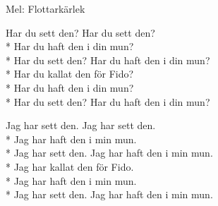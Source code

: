 \begin{SongText}[Fido]
    \begin{SongInfo}
        Mel: Flottarkärlek
    \end{SongInfo}
    \begin{SongVerse}
        Har du sett den? Har du sett den?\\*%
        Har du haft den i din mun?\\*%
        Har du sett den? Har du haft den i din mun?\\*%
        Har du kallat den för Fido?\\*%
        Har du haft den i din mun?\\*%
        Har du sett den? Har du haft den i din mun?
    \end{SongVerse}
    \begin{SongVerse}
        Jag har sett den. Jag har sett den.\\*%
        Jag har haft den i min mun.\\*%
        Jag har sett den. Jag har haft den i min mun.\\*%
        Jag har kallat den för Fido.\\*%
        Jag har haft den i min mun.\\*%
        Jag har sett den. Jag har haft den i min mun.
    \end{SongVerse}
\end{SongText}
